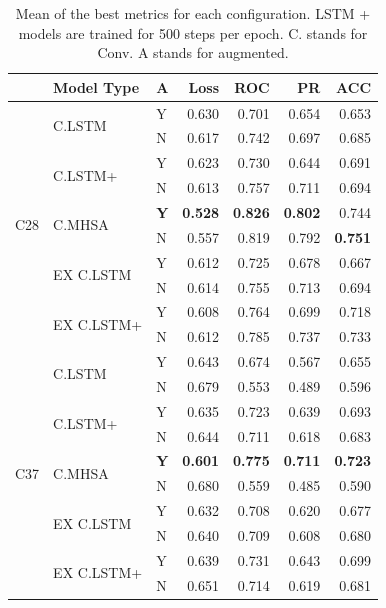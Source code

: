 \documentclass[letterpaper]{article} %
\begin{document}
\begin{table}[t!]
\centering
\small
\begin{tabular}{|l|l|l|r|r|r|r|}
\hline
 &            Model Type & A &   Loss &    ROC &     PR  & ACC \\ \hline
 \multirow{10}{*}{C28} & \multirow{2}{*}{C.LSTM} &   Y &  0.630 &  0.701 &  0.654 & 0.653 \\ \cline{3-7}
  &      &   N &  0.617 &  0.742 &  0.697 & 0.685 \\ \cline{2-7}
  &     \multirow{2}{*}{C.LSTM+} &   Y &  0.623 &  0.730 &  0.644 &   0.691  \\ \cline{3-7}
  &     &   N &  0.613 &  0.757 &  0.711 &  0.694  \\ \cline{2-7}
  &       \multirow{2}{*}{C.MHSA} &   \bf{Y} &  \bf{0.528} &  \bf{0.826} &  \bf{0.802} & 0.744\\ \cline{3-7}
  &     &   N &  0.557 &  0.819 &  0.792  &\bf{0.751}\\ \cline{2-7}
  &    \multirow{2}{*}{EX C.LSTM} &   Y &  0.612 &  0.725 &  0.678 & 0.667\\ \cline{3-7}
  &    &   N &  0.614 &  0.755 &  0.713 & 0.694\\  \cline{2-7}
  &  \multirow{2}{*}{EX C.LSTM+} &   Y &  0.608 &  0.764 &  0.699 & 0.718\\ \cline{3-7}
  &    &   N &  0.612 &  0.785 &  0.737 & 0.733 \\ \hline
 \multirow{10}{*}{C37} & \multirow{2}{*}{C.LSTM} &   Y &  0.643 &  0.674 &  0.567 & 0.655\\ \cline{3-7}
 &      &   N &  0.679 &  0.553 &  0.489 & 0.596\\ \cline{2-7}
 &     \multirow{2}{*}{C.LSTM+} &   Y &  0.635 &  0.723 &  0.639 &  0.693\\ \cline{3-7}
 &     &   N &  0.644 &  0.711 &  0.618 & 0.683  \\ \cline{2-7}
 &       \multirow{2}{*}{C.MHSA} &   \bf{Y} &  \bf{0.601} &  \bf{0.775} &  \bf{0.711} & \bf{0.723}\\ \cline{3-7}
 &   &   N &  0.680 &  0.559 &  0.485 & 0.590 \\ \cline{2-7}
 &    \multirow{2}{*}{EX C.LSTM} &   Y &  0.632 &  0.708 &  0.620 & 0.677\\ \cline{3-7}
 &   &   N &  0.640 &  0.709 &  0.608 & 0.680 \\ \cline{2-7}
 &  \multirow{2}{*}{EX C.LSTM+} &   Y &  0.639 &  0.731 &  0.643 & 0.699 \\ \cline{3-7}
 &  &   N &  0.651 &  0.714 &  0.619 &  0.681\\ \hline
\end{tabular}

\caption{Mean of the best metrics for each configuration. LSTM + models are trained for 500 steps per epoch. C. stands for Conv. A stands for augmented.}
\label{results}


\end{table}
\end{document}
